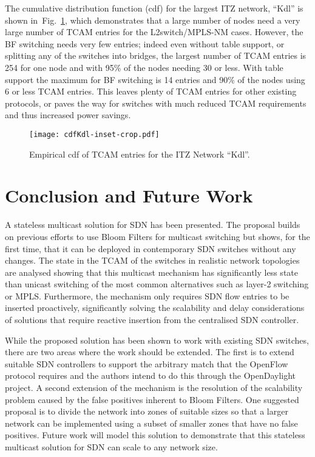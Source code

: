 \documentclass[conference]{IEEEtran}
\newcommand{\figref}[1]{Fig.~\ref{#1}}
\begin{document}
The cumulative distribution function (cdf) for the largest ITZ network, ``Kdl'' is shown in~\figref{fig:cdfKdlL2}, which demonstrates that a large number of nodes need a very large number of TCAM entries for the L2switch/MPLS-NM cases. However, the BF switching needs very few entries; indeed even without table support, or splitting any of the switches into bridges, the largest number of TCAM entries is 254 for one node and with 95\% of the nodes needing 30 or less. With table support the maximum for BF switching is 14 entries and 90\% of the nodes using 6 or less TCAM entries. This leaves plenty of TCAM entries for other existing protocols, or paves the way for switches with much reduced TCAM requirements and thus increased power savings.
\begin{figure}[tb]
  \centering
\texttt{[image: cdfKdl-inset-crop.pdf]}
\caption{Empirical cdf of TCAM entries for the ITZ Network
  ``Kdl''.}
  \label{fig:cdfKdlL2}
\end{figure}

\section{Conclusion and Future Work}
\label{sec:conclusion}
A stateless multicast solution for SDN has been presented. The proposal builds on previous efforts to use Bloom Filters for multicast switching but shows, for the first time, that it can be deployed in contemporary SDN switches without any changes. The state in the TCAM of the switches in realistic network topologies are analysed showing that this multicast mechanism has significantly less state than unicast switching of the most common alternatives such as layer-2 switching or MPLS. Furthermore, the mechanism only requires SDN flow entries to be inserted proactively, significantly solving the scalability and delay considerations of solutions  that require reactive insertion from the centralised SDN controller.

While the proposed solution has been shown to work with existing SDN switches, there are two areas where the work should be extended. The first is to extend suitable SDN controllers to support the arbitrary match that the OpenFlow protocol requires and the authors intend to do this through the OpenDaylight project. A second extension of the mechanism is the resolution of the scalability problem caused by the false positives inherent to Bloom Filters. One suggested proposal is to divide the network into zones of suitable sizes so that a larger network can be implemented using a subset of smaller zones that have no false positives. Future work will model this solution to demonstrate that this stateless multicast solution for SDN can scale to any network size.



\end{document}

